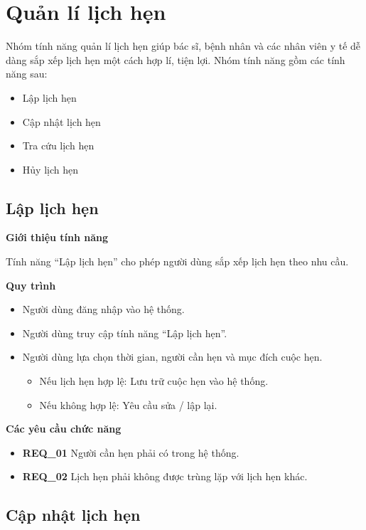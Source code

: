 \section{Quản lí lịch hẹn}

Nhóm tính năng quản lí lịch hẹn giúp bác sĩ, bệnh nhân và các nhân viên y tế dễ dàng sắp xếp lịch hẹn một cách hợp lí, tiện lợi. Nhóm tính năng gồm các tính năng sau:
\begin{itemize}
  \item Lập lịch hẹn
  \item Cập nhật lịch hẹn
  \item Tra cứu lịch hẹn
  \item Hủy lịch hẹn
\end{itemize}

\subsection{Lập lịch hẹn}

\noindent \textbf{Giới thiệu tính năng}

Tính năng ``Lập lịch hẹn'' cho phép người dùng sắp xếp lịch hẹn theo nhu cầu.

\noindent \textbf{Quy trình}
\begin{itemize}
  \item Người dùng đăng nhập vào hệ thống.
  \item Người dùng truy cập tính năng ``Lập lịch hẹn''.
  \item Người dùng lựa chọn thời gian, người cần hẹn và mục đích cuộc hẹn.
    \begin{itemize}
      \item Nếu lịch hẹn hợp lệ: Lưu trữ cuộc hẹn vào hệ thống.
      \item Nếu không hợp lệ: Yêu cầu sửa / lập lại.
    \end{itemize}
\end{itemize}

\noindent \textbf{Các yêu cầu chức năng}
\begin{itemize}
  \item \textbf{REQ\_01} Người cần hẹn phải có trong hệ thống.
  \item \textbf{REQ\_02} Lịch hẹn phải không được trùng lặp với lịch hẹn khác.
\end{itemize}

\subsection{Cập nhật lịch hẹn}

